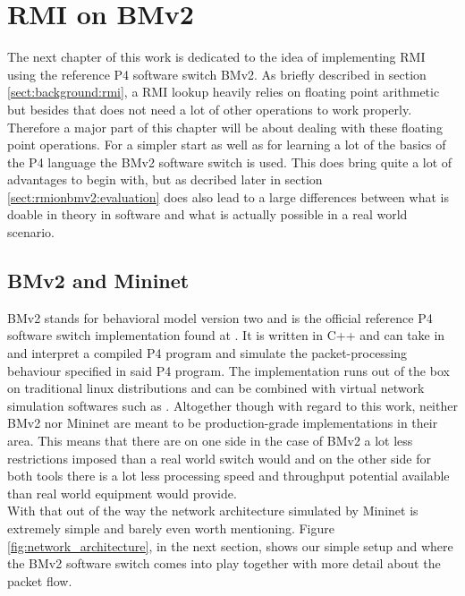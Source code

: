 
\chapter{RMI on BMv2}
\label{ch:rmionbmv2}

The next chapter of this work is dedicated to the idea of implementing RMI using the reference P4 software switch BMv2. As briefly described in section \ref{sect:background:rmi}, a RMI lookup heavily relies on floating point arithmetic but besides that does not need a lot of other operations to work properly. Therefore a major part of this chapter will be about dealing with these floating point operations. For a simpler start as well as for learning a lot of the basics of the P4 language the BMv2 software switch is used. This does bring quite a lot of advantages to begin with, but as decribed later in section \ref{sect:rmionbmv2:evaluation} does also lead to a large differences between what is doable in theory in software and what is actually possible in a real world scenario.

\section{BMv2 and Mininet}
BMv2 stands for behavioral model version two and is the official reference P4 software switch implementation found at \cite{bmv2}. It is written in C++ and can take in and interpret a compiled P4 program and simulate the packet-processing behaviour specified in said P4 program. The implementation runs out of the box on traditional linux distributions and can be combined with virtual network simulation softwares such as \cite{mininet}. Altogether though with regard to this work, neither BMv2 nor Mininet are meant to be production-grade implementations in their area. This means that there are on one side in the case of BMv2 a lot less restrictions imposed than a real world switch would and on the other side for both tools there is a lot less processing speed and throughput potential available than real world equipment would provide.\\

With that out of the way the network architecture simulated by Mininet is extremely simple and barely even worth mentioning. Figure \ref{fig:network_architecture}, in the next section, shows our simple setup and where the BMv2 software switch comes into play together with more detail about the packet flow.

